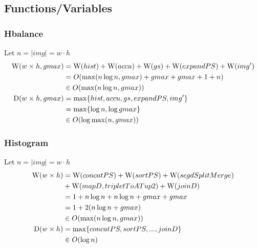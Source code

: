     \subsection{Functions/Variables}

    \subsubsection{Hbalance}
      Let $n = |img| = w\cdot h$
      \begin{equation}
      \begin{split}
      \textrm{W}(w \times h,gmax)
            & = \textrm{W}(hist) + \textrm{W}(accu) + \textrm{W}(gs) + \textrm{W}(expandPS) + \textrm{W}(img') \\
            & = O( \max(n \log n, gmax) + gmax + gmax + 1 + n) \\
            & \in O(\max(n \log n, gmax)) \\
      \textrm{D}(w \times h,gmax)
          & = \max \{ hist, accu, gs, expandPS, img'\} \\
          & = \max \{\log n, \log gmax \} \\
          & \in O(\log \max(n,gmax)) \\
      \end{split}
      \end{equation}
        
    \subsubsection{Histogram}
      Let $n = |img| = w\cdot h$
      \begin{equation}
      \begin{split}
      \textrm{W}(w \times h)
            & = \textrm{W}(concatPS) + \textrm{W}(sortPS) + \textrm{W}(segdSplitMerge) \\
            & + \textrm{W}(mapD,tripletToATup2) + \textrm{W}(joinD) \\
            & = 1 + n \log n + n \log n + gmax + gmax \\
            & = 1 + 2 (n \log n + gmax) \\
            & \in O(\max(n \log n, gmax)) \\
      \textrm{D}(w \times h)
            & = \max \{ concatPS,sortPS,...,joinD\} \\
            & \in O(\log n) \\
      \end{split}
      \end{equation}
    
